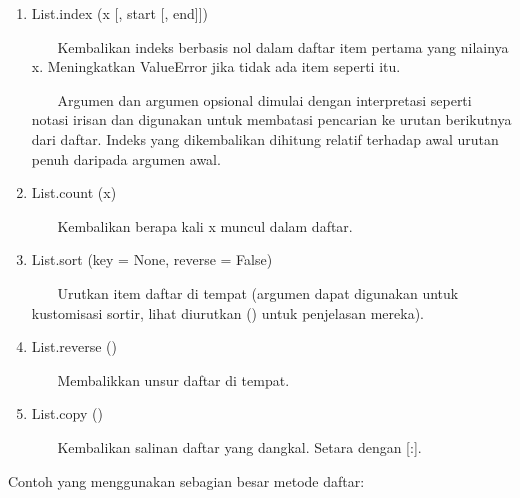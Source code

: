 \begin{enumerate}
\vspace{12pt}
\item
List.index (x [, start [, end]]) \par
\vspace{12pt}
~~~ Kembalikan indeks berbasis nol dalam daftar item pertama yang nilainya x. Meningkatkan ValueError jika tidak ada item seperti itu. \par
\vspace{12pt}
~~~ Argumen dan argumen opsional dimulai dengan interpretasi seperti notasi irisan dan digunakan untuk membatasi pencarian ke urutan berikutnya dari daftar. Indeks yang dikembalikan dihitung relatif terhadap awal urutan penuh daripada argumen awal. \par
\vspace{12pt}
\item
List.count (x) \par
\vspace{12pt}
~~~ Kembalikan berapa kali x muncul dalam daftar. \par
\vspace{12pt}
\item
List.sort (key = None, reverse = False) \par
\vspace{12pt}
~~~ Urutkan item daftar di tempat (argumen dapat digunakan untuk kustomisasi sortir, lihat diurutkan () untuk penjelasan mereka). \par
\vspace{12pt}
\item
List.reverse () \par
\vspace{12pt}
~~~ Membalikkan unsur daftar di tempat. \par
\vspace{12pt}
\item
List.copy () \par
\vspace{12pt}
~~~ Kembalikan salinan daftar yang dangkal. Setara dengan [:]. \par
\end{enumerate}
\vspace{12pt}
Contoh yang menggunakan sebagian besar metode daftar: \par
\vspace{12pt}
